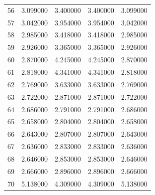 \begin{tabular}{lrrrr}
56 & 3.099000 & 3.400000 & 3.400000 & 3.099000 \\
57 & 3.042000 & 3.954000 & 3.954000 & 3.042000 \\
58 & 2.985000 & 3.418000 & 3.418000 & 2.985000 \\
59 & 2.926000 & 3.365000 & 3.365000 & 2.926000 \\
60 & 2.870000 & 4.245000 & 4.245000 & 2.870000 \\
61 & 2.818000 & 4.341000 & 4.341000 & 2.818000 \\
62 & 2.769000 & 3.633000 & 3.633000 & 2.769000 \\
63 & 2.722000 & 2.871000 & 2.871000 & 2.722000 \\
64 & 2.686000 & 2.791000 & 2.791000 & 2.686000 \\
65 & 2.658000 & 2.804000 & 2.804000 & 2.658000 \\
66 & 2.643000 & 2.807000 & 2.807000 & 2.643000 \\
67 & 2.636000 & 2.833000 & 2.833000 & 2.636000 \\
68 & 2.646000 & 2.853000 & 2.853000 & 2.646000 \\
69 & 2.666000 & 2.896000 & 2.896000 & 2.666000 \\
70 & 5.138000 & 4.309000 & 4.309000 & 5.138000 \\
\bottomrule
\end{tabular}
